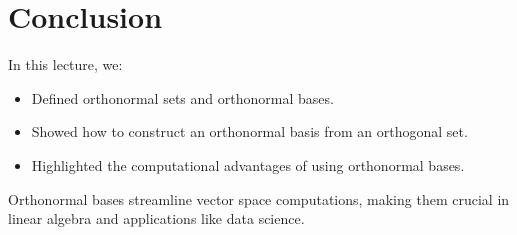 \documentclass{article}
\begin{document}
\section*{Conclusion}

In this lecture, we:
\begin{itemize}
  \item Defined orthonormal sets and orthonormal bases.
  \item Showed how to construct an orthonormal basis from an orthogonal set.
  \item Highlighted the computational advantages of using orthonormal bases.
\end{itemize}

Orthonormal bases streamline vector space computations, making them crucial in linear algebra and applications like data science.
\end{document}
